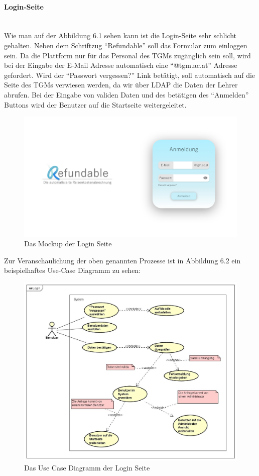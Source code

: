 \paragraph{Login-Seite}
~\\
Wie man auf der Abbildung 6.1 sehen kann ist die Login-Seite sehr schlicht gehalten. Neben dem Schriftzug \enquote{Refundable} soll das Formular zum einloggen sein. Da die Plattform nur für das Personal des TGMs zugänglich sein soll, wird bei der Eingabe der E-Mail Adresse automatisch eine \enquote{@tgm.ac.at} Adresse gefordert. Wird der \enquote{Passwort vergessen?} Link betätigt, soll automatisch auf die Seite des TGMs verwiesen werden, da wir über LDAP die Daten der Lehrer abrufen. Bei der Eingabe von validen Daten und des betätigen des \enquote{Anmelden} Buttons wird der Benutzer auf die Startseite weitergeleitet.
\begin{figure}[H]
	\centering
	\includegraphics[width=1\linewidth]{images/Mockup-Startseite}
	\caption[Mockup Login]{Das Mockup der Login Seite}
	\label{fig:mockupLogin}
\end{figure}
Zur Veranschaulichung der oben genannten Prozesse ist in Abbildung 6.2 ein beispielhaftes Use-Case Diagramm zu sehen: 
\begin{figure}[H]
	\centering
	\includegraphics[width=1\linewidth]{images/uc-login}
	\caption[Use Case Diagramm Login]{Das Use Case Diagramm der Login Seite}
	\label{fig:ucLogin}
\end{figure}
\newpage
